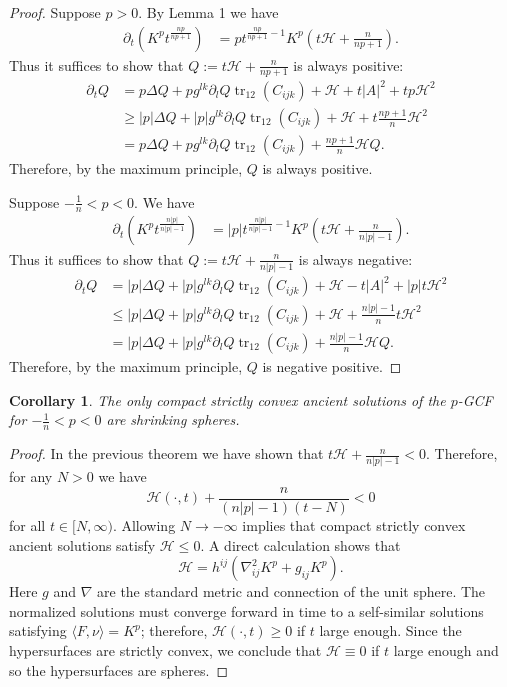 \documentclass{amsart}
\newtheorem{corollary}[theorem]{Corollary}
\theoremstyle{definition}
\theoremstyle{remark}
\numberwithin{equation}{section}
\begin{document}
\begin{proof}
Suppose $p>0.$
By Lemma 1 we have
\begin{align*}
\partial_t \left(K^{ p }t^{\frac{n p }{n p +1}}\right)&= p  t^{\frac{n p }{n p +1}-1}K^{ p }\left(t\mathcal{H}+\frac{n}{n p +1}\right).
\end{align*}
Thus it suffices to show that $Q:=t\mathcal{H}+\frac{n}{n p +1}$ is always positive:
\begin{align*}
\partial_t Q&= p\Delta Q+ p  g^{lk}\partial_lQ \operatorname{tr}_{12}( C _{ijk})+\mathcal{H}+t| A |^2+  tp \mathcal{H}^2\\
&\geq  |p| \Delta Q+ |p|  g^{lk}\partial_lQ \operatorname{tr}_{12}( C _{ijk})+\mathcal{H}+t\frac{n p +1}{n} \mathcal{H}^2\\
&= p \Delta Q+ p  g^{lk}\partial_lQ \operatorname{tr}_{12}( C _{ijk})+\frac{n p +1}{n}\mathcal{H}Q.
\end{align*}
Therefore, by the maximum principle, $Q$ is always positive.


Suppose $-\frac{1}{n}<p<0.$ We have
\begin{align*}
\partial_t \left(K^{ p }t^{\frac{n |p| }{n |p| -1}}\right)&= |p|  t^{\frac{n |p| }{n |p| -1}-1}K^{ p }\left(t\mathcal{H}+\frac{n}{n |p| -1}\right).
\end{align*}
Thus it suffices to show that $Q:=t\mathcal{H}+\frac{n}{n |p| -1}$ is always negative:
\begin{align*}
\partial_t Q&= |p| \Delta Q+ |p|  g^{lk}\partial_lQ \operatorname{tr}_{12}( C _{ijk})+\mathcal{H}-t| A |^2+ |p|  t \mathcal{H}^2\\
&\leq  |p| \Delta Q+ |p|  g^{lk}\partial_lQ \operatorname{tr}_{12}( C _{ijk})+\mathcal{H}+\frac{n |p| -1}{n}t \mathcal{H}^2\\
&= |p| \Delta Q+ |p|  g^{lk}\partial_lQ \operatorname{tr}_{12}( C _{ijk})+\frac{n |p| -1}{n}\mathcal{H}Q.
\end{align*}
Therefore, by the maximum principle, $Q$ is negative positive.
\end{proof}
\begin{corollary}
The only compact strictly convex ancient solutions of the $p$-GCF for $-\frac{1}{n}<p<0$ are shrinking spheres.
\end{corollary}
\begin{proof}
In the previous theorem we have shown
that $t\mathcal{H}+\frac{n}{n |p| -1}<0$. Therefore, for any $N>0$ we have
\[\mathcal{H}(\cdot,t)+\frac{n}{(n |p| -1)(t-N)}<0\]
for all $t\in [N,\infty).$
Allowing $N\to -\infty$ implies that compact strictly convex ancient solutions satisfy $\mathcal{H}\leq 0.$ A direct calculation shows that
\[\mathcal{H}=h^{ij}(\nabla_{ij}^2K^p+g_{ij}K^{p}).\]
Here $g$ and $\nabla$ are the standard metric and connection of the unit sphere. The normalized solutions must converge forward in time to a self-similar solutions satisfying $\langle F,\nu \rangle=K^{p}$; therefore, $\mathcal{H}(\cdot,t)\geq 0$ if $t$ large enough. Since the hypersurfaces are strictly convex, we conclude that  $\mathcal{H}\equiv 0$ if $t$ large enough and so the hypersurfaces are spheres.
\end{proof}
\end{document}
